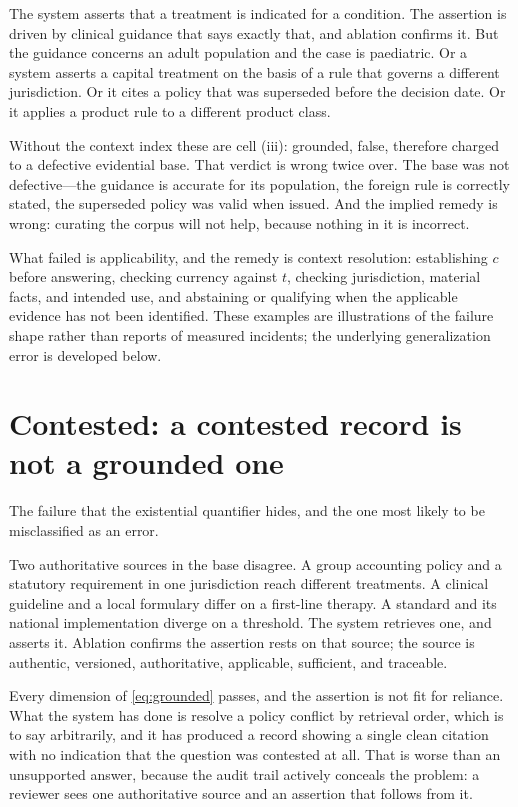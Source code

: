 The system asserts that a treatment is indicated for a condition. The assertion is
driven by clinical guidance that says exactly that, and ablation confirms it. But
the guidance concerns an adult population and the case is paediatric. Or a system
asserts a capital treatment on the basis of a rule that governs a different
jurisdiction. Or it cites a policy that was superseded before the decision date. Or
it applies a product rule to a different product class.

Without the context index these are cell (iii): grounded, false, therefore charged
to a defective evidential base. That verdict is wrong twice over. The base was not
defective---the guidance is accurate for its population, the foreign rule is
correctly stated, the superseded policy was valid when issued. And the implied
remedy is wrong: curating the corpus will not help, because nothing in it is
incorrect.

What failed is applicability, and the remedy is context resolution: establishing
$c$ before answering, checking currency against $t$, checking jurisdiction,
material facts, and intended use, and abstaining or qualifying when the applicable
evidence has not been identified. These examples are illustrations of the failure
shape rather than reports of measured incidents; the underlying generalization
error is developed below.
\section{Contested: a contested record is not a grounded one}
\label{sec:contested}

The failure that the existential quantifier hides, and the one most likely to be
misclassified as an error.

Two authoritative sources in the base disagree. A group accounting policy and a
statutory requirement in one jurisdiction reach different treatments. A clinical
guideline and a local formulary differ on a first-line therapy. A standard and its
national implementation diverge on a threshold. The system retrieves one, and asserts
it. Ablation confirms the assertion rests on that source; the source is authentic,
versioned, authoritative, applicable, sufficient, and traceable.

Every dimension of \eqref{eq:grounded} passes, and the assertion is not fit for
reliance. What the system has done is resolve a policy conflict by retrieval order,
which is to say arbitrarily, and it has produced a record showing a single clean
citation with no indication that the question was contested at all. That is worse than
an unsupported answer, because the audit trail actively conceals the problem: a
reviewer sees one authoritative source and an assertion that follows from it.

